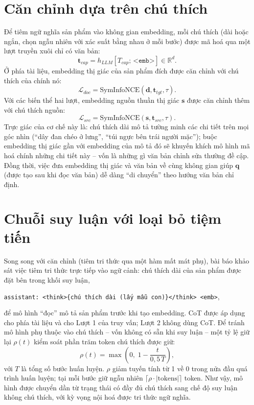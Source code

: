 \section{Căn chỉnh dựa trên chú thích}\label{sec:procir-align}

Để tiêm ngữ nghĩa sản phẩm vào không gian embedding, mỗi chú thích (dài hoặc ngắn, chọn ngẫu nhiên với xác suất bằng nhau ở mỗi bước) được mã hoá qua một lượt truyền xuôi chỉ có văn bản:
\begin{equation}
    \mathbf{t}_{cap} = h_{LLM}[T_{cap};\, \texttt{<emb>}] \in \mathbb{R}^{d}.
\end{equation}
Ở phía tài liệu, embedding thị giác của sản phẩm đích được căn chỉnh với chú thích của chính nó:
\begin{equation}
    \mathcal{L}_{doc} = \mathrm{SymInfoNCE}(\mathbf{d}, \mathbf{t}_{tgt}, \tau).
\end{equation}
Với các biến thể hai lượt, embedding nguồn thuần thị giác $\mathbf{s}$ được căn chỉnh thêm với chú thích nguồn:
\begin{equation}
    \mathcal{L}_{src} = \mathrm{SymInfoNCE}(\mathbf{s}, \mathbf{t}_{src}, \tau).
\end{equation}
Trực giác của cơ chế này là: chú thích dài mô tả tường minh các chi tiết trên mọi góc nhìn (``dây đan chéo ở lưng'', ``túi ngực bên trái người mặc''); buộc embedding thị giác gần với embedding của mô tả đó sẽ khuyến khích mô hình mã hoá chính những chi tiết này -- vốn là những gì văn bản chỉnh sửa thường đề cập. Đồng thời, việc đưa embedding thị giác và văn bản về cùng không gian giúp $\mathbf{q}$ (được tạo sau khi đọc văn bản) dễ dàng ``di chuyển'' theo hướng văn bản chỉ định.

\section{Chuỗi suy luận với loại bỏ tiệm tiến}\label{sec:procir-cot}

Song song với căn chỉnh (tiêm tri thức qua một hàm mất mát phụ), bài báo khảo sát việc tiêm tri thức trực tiếp vào ngữ cảnh: chú thích dài của sản phẩm được đặt bên trong khối suy luận,
\begin{center}
\texttt{assistant: <think>\{chú thích dài (lấy mẫu con)\}</think> <emb>},
\end{center}
để mô hình ``đọc'' mô tả sản phẩm trước khi tạo embedding. CoT được áp dụng cho phía tài liệu và cho Lượt 1 của truy vấn; Lượt 2 không dùng CoT. Để tránh mô hình phụ thuộc vào chú thích -- vốn không có sẵn khi suy luận -- một tỷ lệ giữ lại $\rho(t)$ kiểm soát phần trăm token chú thích được giữ:
\begin{equation}
    \rho(t) = \max\!\left(0,\; 1 - \frac{t}{0{,}5\,T}\right),
\end{equation}
với $T$ là tổng số bước huấn luyện. $\rho$ giảm tuyến tính từ 1 về 0 trong nửa đầu quá trình huấn luyện; tại mỗi bước giữ ngẫu nhiên $\lceil \rho \cdot |\text{tokens}| \rceil$ token. Như vậy, mô hình được chuyển dần từ trạng thái có đầy đủ chú thích sang chế độ suy luận không chú thích, với kỳ vọng nội hoá được tri thức ngữ nghĩa.


